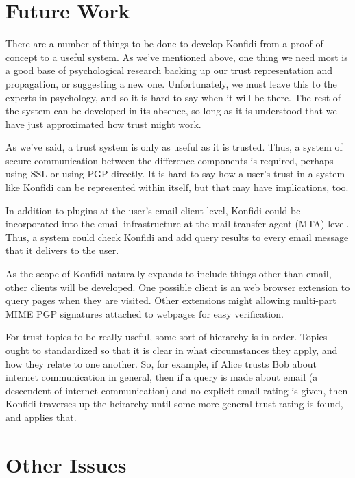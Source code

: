\documentclass{acm_proc_article-sp}
\begin{document}
\section{Future Work}
There are a number of things to be done to develop Konfidi from a proof-of-concept to a useful system.  As we've mentioned above, one thing we need most is a good base of psychological research backing up our trust representation and propagation, or suggesting a new one.  Unfortunately, we must leave this to the experts in psychology, and so it is hard to say when it will be there.  The rest of the system can be developed in its absence, so long as it is understood that we have just approximated how trust might work.

As we've said, a trust system is only as useful as it is trusted.  Thus, a system of secure communication between the difference components is required, perhaps using SSL or using PGP directly.  It is hard to say how a user's trust in a system like Konfidi can be represented within itself, but that may have implications, too.

In addition to plugins at the user's email client level, Konfidi could be incorporated into the email infrastructure at the mail transfer agent (MTA) level.  Thus, a system could check Konfidi and add query results to every email message that it delivers to the user.

As the scope of Konfidi naturally expands to include things other than email, other clients will be developed.  One possible client is an web browser extension to query pages when they are visited.  Other extensions might allowing multi-part MIME PGP signatures attached to webpages for easy verification.  

For trust topics to be really useful, some sort of hierarchy is in order.  Topics ought to standardized so that it is clear in what circumstances they apply, and how they relate to one another.  So, for example, if Alice trusts Bob about internet communication in general, then if a query is made about email (a descendent of internet communication) and no explicit email rating is given, then Konfidi traverses up the heirarchy until some more general trust rating is found, and applies that.

\section{Other Issues}
\end{document}

